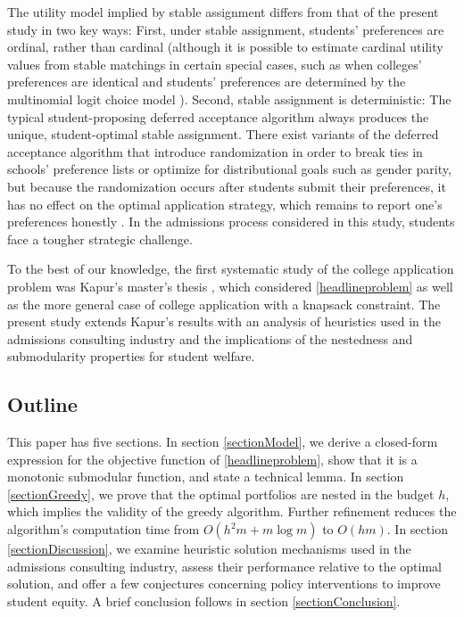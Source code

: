 The utility model implied by stable assignment differs from that of the present study in two key ways: First, under stable assignment, students' preferences are ordinal, rather than cardinal (although it is possible to estimate cardinal utility values from stable matchings in certain special cases, such as when colleges' preferences are identical and students' preferences are determined by the multinomial logit choice model \cite{kapur2021}). Second, stable assignment is deterministic: The typical student-proposing deferred acceptance algorithm always produces the unique, student-optimal stable assignment. There exist variants of the deferred acceptance algorithm that introduce randomization in order to break ties in schools' preference lists or optimize for distributional goals such as gender parity, but because the randomization occurs after students submit their preferences, it has no effect on the optimal application strategy, which remains to report one's preferences honestly \cite{ashlagiandnikzad2020,bodohcreed2020}. In the admissions process considered in this study, students face a tougher strategic challenge.

To the best of our knowledge, the first systematic study of the college application problem was Kapur's master's thesis \cite{kapur2022}, which considered \eqref{headlineproblem} as well as the more general case of college application with a knapsack constraint. The present study extends Kapur's results with an analysis of heuristics used in the admissions consulting industry and the implications of the nestedness and submodularity properties for student welfare.

\subsection{Outline}

This paper has five sections. In section \ref{sectionModel}, we derive a closed-form expression for the objective function of \eqref{headlineproblem}, show that it is a monotonic submodular function, and state a technical lemma. In section \ref{sectionGreedy}, we prove that the optimal portfolios are nested in the budget $h$, which implies the validity of the greedy algorithm. Further refinement reduces the algorithm's computation time from $O(h^2 m + m\log m)$ to $O(hm)$. In section \ref{sectionDiscussion}, we examine heuristic solution mechanisms used in the admissions consulting industry, assess their performance relative to the optimal solution, and offer a few conjectures concerning policy interventions to improve student equity. A brief conclusion follows in section \ref{sectionConclusion}.







